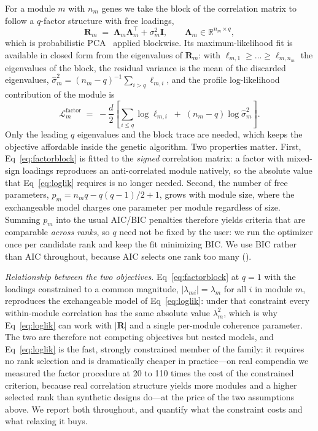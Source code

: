 For a module $m$ with $n_m$ genes we take the block of the correlation matrix to
follow a $q$-factor structure with free loadings,
\begin{equation}
\mathbf{R}_m \;=\; \boldsymbol{\Lambda}_m\boldsymbol{\Lambda}_m^{\!\top} + \sigma_m^2\mathbf{I},
\qquad \boldsymbol{\Lambda}_m \in \mathbb{R}^{n_m \times q},
\label{eq:factorblock}
\end{equation}
which is probabilistic PCA~\cite{TippingBishop1999} applied blockwise. Its
maximum-likelihood fit is available in closed form from the eigenvalues of
$\mathbf{R}_m$: with $\ell_{m,1}\ge\dots\ge\ell_{m,n_m}$ the eigenvalues of the
block, the residual variance is the mean of the discarded eigenvalues,
$\hat{\sigma}^2_m = (n_m-q)^{-1}\sum_{i>q}\ell_{m,i}$, and the profile
log-likelihood contribution of the module is
\begin{equation}
\mathcal{L}^{\text{factor}}_m \;=\; -\frac{d}{2}\left[\sum_{i\le q}\log \ell_{m,i}
\;+\;(n_m-q)\log\hat{\sigma}^2_m\right].
\label{eq:factorloglik}
\end{equation}
Only the leading $q$ eigenvalues and the block trace are needed, which keeps the
objective affordable inside the genetic algorithm. Two properties matter. First,
Eq~\eqref{eq:factorblock} is fitted to the \emph{signed} correlation matrix: a
factor with mixed-sign loadings reproduces an anti-correlated module natively, so
the absolute value that Eq~\eqref{eq:loglik} requires is no longer needed.
Second, the number of free parameters,
$p_m = n_m q - q(q-1)/2 + 1$, grows with module size, where the exchangeable
model charges one parameter per module regardless of size. Summing $p_m$ into the
usual AIC/BIC penalties therefore yields criteria that are comparable
\emph{across ranks}, so $q$ need not be fixed by the user: we run the optimizer
once per candidate rank and keep the fit minimizing BIC. We use BIC rather than
AIC throughout, because AIC selects one rank too many ().

\emph{Relationship between the two objectives.} Eq~\eqref{eq:factorblock} at
$q=1$ with the loadings constrained to a common magnitude,
$\lvert\lambda_{mi}\rvert=\lambda_m$ for all $i$ in module $m$, reproduces the
exchangeable model of Eq~\eqref{eq:loglik}: under that constraint every
within-module correlation has the same absolute value $\lambda_m^2$, which is why
Eq~\eqref{eq:loglik} can work with $\lvert\mathbf{R}\rvert$ and a single
per-module coherence parameter. The two are therefore not competing objectives
but nested models, and Eq~\eqref{eq:loglik} is the fast, strongly constrained
member of the family: it requires no rank selection and is dramatically cheaper
in practice---on real compendia we measured the factor procedure at 20 to 110
times the cost of the constrained criterion, because real correlation structure
yields more modules and a higher selected rank than synthetic designs do---at the
price of the two assumptions above. We report both throughout, and quantify what
the constraint costs and what relaxing it buys.

